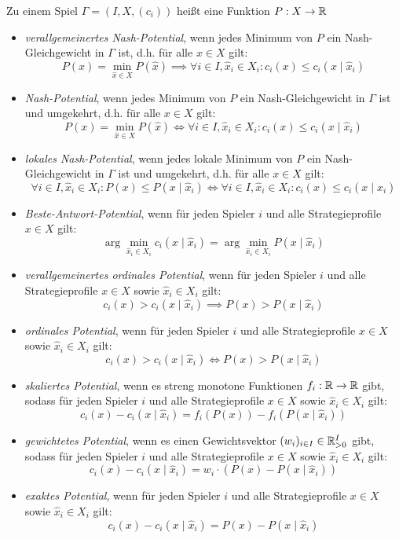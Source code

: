 \begin{defn}
	Zu einem Spiel $\Gamma = (I, X, (c_i))$ heißt eine Funktion $P: X \to \mathbb{R}$
	\begin{itemize}
		\item \emph{verallgemeinertes Nash-Potential}, wenn jedes Minimum von $P$ ein Nash-Gleichgewicht in $\Gamma$ ist, d.h. für alle $x \in X$ gilt:
			\[P(x) = \min_{\hat{x} \in X}P(\hat{x}) \implies \forall i \in I, \hat{x}_i \in X_i: c_i(x) \leq c_i(x \mid \hat{x}_i) \]
		\item \emph{Nash-Potential}, wenn jedes Minimum von $P$ ein Nash-Gleichgewicht in $\Gamma$ ist und umgekehrt, d.h. für alle $x \in X$ gilt:
			\[P(x) = \min_{\hat{x} \in X}P(\hat{x}) \iff \forall i \in I, \hat{x}_i \in X_i: c_i(x) \leq c_i(x \mid \hat{x}_i) \]
		\item \emph{lokales Nash-Potential}, wenn jedes \glqq lokale\grqq{} Minimum von $P$ ein Nash-Gleichgewicht in $\Gamma$ ist und umgekehrt, d.h. für alle $x \in X$ gilt:
			\[\forall i \in I, \hat{x}_i \in X_i: P(x) \leq P(x \mid \hat{x}_i) \iff \forall i \in I, \hat{x}_i \in X_i: c_i(x) \leq c_i(x \mid \hat{x}_i) \]
		\item \emph{Beste-Antwort-Potential}, wenn für jeden Spieler $i$ und alle Strategieprofile $x \in X$ gilt:
			\[\arg\min_{\hat{x}_i \in X_i}c_i(x \mid \hat{x}_i) = \arg \min_{\hat{x}_i \in X_i} P(x \mid \hat{x}_i)\]
		\item \emph{verallgemeinertes ordinales Potential}, wenn für jeden Spieler $i$ und alle Strategieprofile $x \in X$ sowie $\hat{x}_i \in X_i$ gilt:
			\[c_i(x) > c_i(x \mid \hat{x}_i) \implies P(x) > P(x \mid \hat{x}_i)\]
		\item \emph{ordinales Potential}, wenn für jeden Spieler $i$ und alle Strategieprofile $x \in X$ sowie $\hat{x}_i \in X_i$ gilt:
			\[c_i(x) > c_i(x \mid \hat{x}_i) \iff P(x) > P(x \mid \hat{x}_i)\]
		\item \emph{skaliertes Potential}, wenn es streng monotone Funktionen $f_i: \mathbb{R} \to \mathbb{R}$ gibt, sodass für jeden Spieler $i$ und alle Strategieprofile $x \in X$ sowie $\hat{x}_i \in X_i$ gilt:
			\[c_i(x) - c_i(x \mid \hat{x}_i) = f_i(P(x)) - f_i(P(x \mid \hat{x}_i))\]
		\item \emph{gewichtetes Potential}, wenn es einen Gewichtsvektor $(w_i)_{i\in I} \in \mathbb{R}_{>0}^I$ gibt, sodass für jeden Spieler $i$ und alle Strategieprofile $x \in X$ sowie $\hat{x}_i \in X_i$ gilt:
			\[c_i(x) - c_i(x \mid \hat{x}_i) = w_i\cdot(P(x) - P(x \mid \hat{x}_i))\]
		\item \emph{exaktes Potential}, wenn für jeden Spieler $i$ und alle Strategieprofile $x \in X$ sowie $\hat{x}_i \in X_i$ gilt:
			\[c_i(x) - c_i(x \mid \hat{x}_i) = P(x) - P(x \mid \hat{x}_i)\]
	\end{itemize}
\end{defn}

